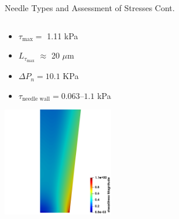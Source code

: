 \begin{frame}{Needle Types and Assessment of Stresses Cont.}
\begin{columns}
\begin{column}{.36\textwidth}
\begin{itemize}
    \item $\tau_{\text{max}} = $ 1.11 kPa
    \item $L_{\tau_{\text{max}}}$  $\approx$ 20 $\mu$m
    \item $\Delta P_n = 10.1$ KPa
    \item $\tau_{\text{needle wall}} = 0.063$–$1.1$ kPa 
\end{itemize}
\vspace{1mm}
\centering
\includegraphics[trim = 0mm 0mm 0mm 50mm, clip, width=1.9in]{./images/needle_tapered_stress@25C.png}
\end{column}
\end{columns}

\end{frame}


